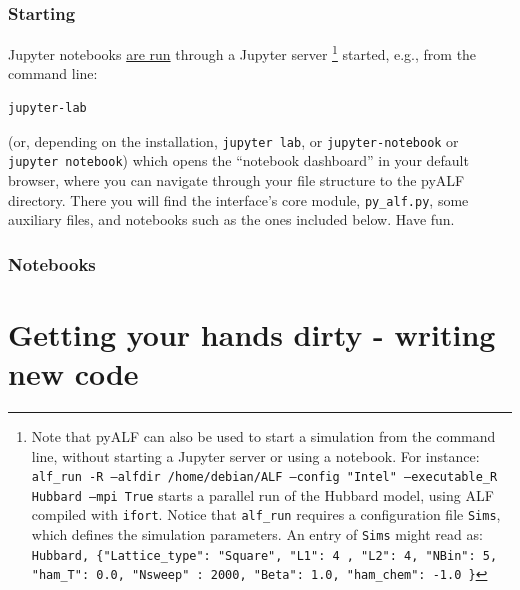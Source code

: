 \documentclass[10pt,modern]{scrartcl}
\numberwithin{exerciseitem}{exercise} %
\begin{document}
\section*{Starting}

Jupyter notebooks \href{https://jupyter.readthedocs.io/en/latest/running.html}{are run} through a Jupyter server
\footnote{Note that pyALF can also be used to start a simulation from the command line, without starting a Jupyter server or using a notebook. For instance: \texttt{alf\_run -R  --alfdir /home/debian/ALF --config "Intel"  --executable\_R Hubbard --mpi True} starts a parallel run of the Hubbard model, using ALF compiled with \texttt{ifort}.  Notice that \texttt{alf\_run} requires a configuration file  \texttt{Sims}, which defines the simulation parameters. An entry of \texttt{Sims} might read as: 
\texttt{Hubbard, \{"Lattice\_type": "Square", "L1": 4 , "L2": 4, "NBin": 5, "ham\_T": 0.0, "Nsweep" : 2000, "Beta": 1.0, "ham\_chem": -1.0 \}}} started, e.g., from the command line:
\begin{lstlisting}[style=bash]
jupyter-lab
\end{lstlisting}
(or, depending on the installation, \texttt{jupyter lab}, or \texttt{jupyter-notebook} or \texttt{jupyter notebook})
which opens the ``notebook dashboard'' in your default browser, where you can navigate through your file structure to the pyALF directory. There you will find the interface's core module, \texttt{py\_alf.py}, some auxiliary files, and notebooks such as the ones included below. Have fun. 

\section*{Notebooks}










\newpage

\part{Getting your hands dirty - writing new code}
\end{document}
